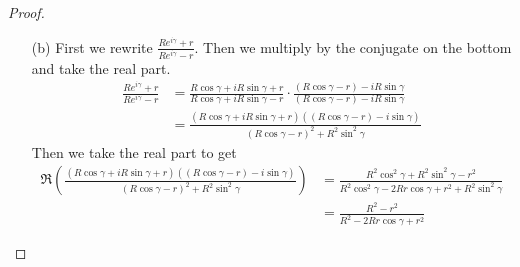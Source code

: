 \documentclass[10pt]{article}
\theoremstyle{plain}
\theoremstyle{remark}
\begin{document}
\begin{proof}
\begin{itemize}
  \item[(b)] First we rewrite $\frac{Re^{i\gamma}+r}{Re^{i\gamma}-r}$. Then we multiply
    by the conjugate on the bottom and take the real part.
    \begin{align*}
      \frac{Re^{i\gamma}+r}{Re^{i\gamma}-r} &= \frac{R\cos\gamma+iR\sin\gamma+r}{R\cos\gamma+iR\sin\gamma-r}\cdot\frac{(R\cos\gamma-r)-iR\sin\gamma}{(R\cos\gamma-r)-iR\sin\gamma}\\
                                       &=\frac{(R\cos\gamma+iR\sin\gamma+r)((R\cos\gamma-r)-i\sin\gamma)}{(R\cos\gamma-r)^2+R^2\sin^2\gamma}
    \end{align*}
    Then we take the real part to get
    \begin{align*}
      \Re\left(\frac{(R\cos\gamma+iR\sin\gamma+r)((R\cos\gamma-r)-i\sin\gamma)}{(R\cos\gamma-r)^2+R^2\sin^2\gamma}\right) &= \frac{R^2\cos^2\gamma+R^2\sin^2\gamma-r^2}{R^2\cos^2\gamma-2Rr\cos\gamma+r^2+R^2\sin^2\gamma}\\
                                                                                       &= \frac{R^2-r^2}{R^2-2Rr\cos\gamma+r^2}
    \end{align*}
  \end{itemize}
\end{proof}

\end{document}

